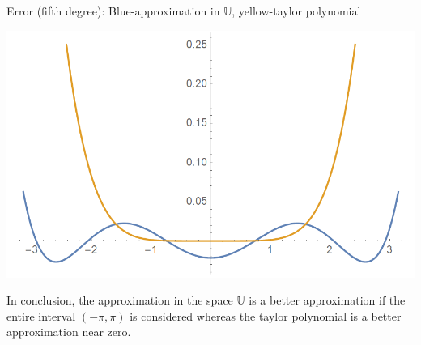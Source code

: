 \begin{sol}
\begin{enumerate}[label=\textbf{(\alph*)}]
\begin{center}
\end{center}
\newpage
Error (fifth degree): Blue-approximation in $\mathbb U$, yellow-taylor polynomial
\begin{center}
\includegraphics[scale=0.7]{P04/cos error.PNG}
\end{center}
In conclusion, the approximation in the space $\mathbb U$ is a better approximation if the entire interval $(-\pi,\pi)$ is considered whereas the taylor polynomial is a better approximation near zero. 

\end{enumerate}
\end{sol}